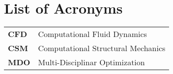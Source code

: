 \chapter*{List of Acronyms}

\begin{longtable}{ll}
\textbf{CFD} & Computational Fluid Dynamics \\
\textbf{CSM} & Computational Structural Mechanics \\
\textbf{MDO} & Multi-Disciplinar Optimization \\
\end{longtable}

